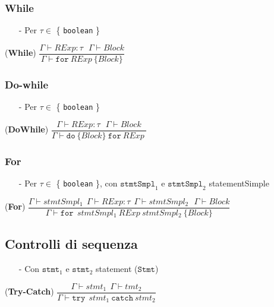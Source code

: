 \documentclass[12pt]{article}
\begin{document}
\subsubsection*{While}
\begin{center}
\begin{itemize}
\item[-] Per $\tau \in$ \{ \texttt{boolean} \}
\end{itemize}
\noindent(\textbf{While})
$\dfrac{\Gamma \vdash RExp:\tau\ \ \ \Gamma \vdash Block}{\Gamma \vdash \texttt{for}\ RExp\ \{ Block\}}$\\[0.1in]
\end{center}

\subsubsection*{Do-while}
\begin{center}
\begin{itemize}
\item[-] Per $\tau \in$ \{ \texttt{boolean} \}
\end{itemize}
\noindent(\textbf{DoWhile})
$\dfrac{\Gamma \vdash RExp:\tau\ \ \ \Gamma \vdash Block}{\Gamma \vdash \texttt{do} \ \{ Block\} \ \texttt{for} \ RExp\ }$\\[0.1in]
\end{center}

\subsubsection*{For}
\begin{center}
\begin{itemize}
\item[-] Per $\tau \in$ \{ \texttt{boolean} \}, con $\texttt{stmtSmpl}_1$ e $\texttt{stmtSmpl}_2$ statementSimple
\end{itemize}
\noindent(\textbf{For})
$\dfrac{\Gamma \vdash stmtSmpl_1 \ \ \Gamma \vdash RExp:\tau \ \ \Gamma \vdash stmtSmpl_2 \ \ \ \Gamma \vdash Block}{\Gamma \vdash  \texttt{for} \ \ stmtSmpl_1 \ RExp \ stmtSmpl_2 \ \{ Block\}}$\\[0.1in]
\end{center}

\subsection*{Controlli di sequenza}
\begin{center}
\begin{itemize}
\item[-] Con $\texttt{stmt}_1$ e $\texttt{stmt}_2$ statement ($\texttt{Stmt}$)
\end{itemize}
\noindent(\textbf{Try-Catch})
$\dfrac{\Gamma \vdash stmt_1\ \ \Gamma \vdash tmt_2}{\Gamma \vdash  \texttt{try} \ \ stmt_1 \ \texttt{catch} \ stmt_2}$\\[0.1in]
\end{center}
\end{document}
